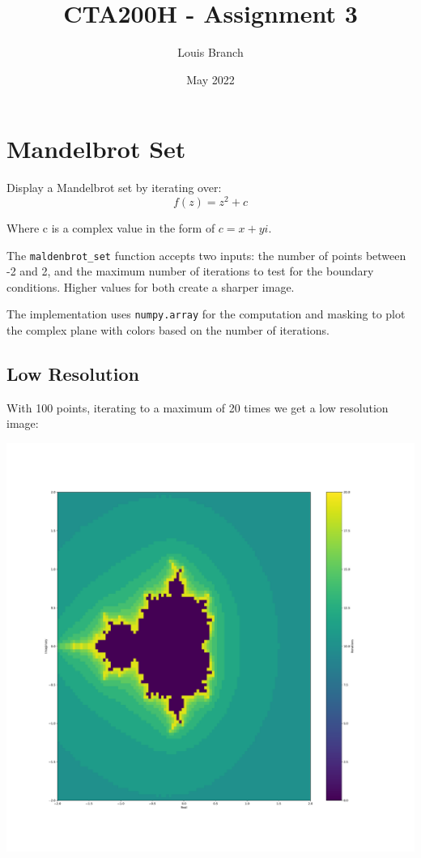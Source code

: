 \documentclass{article}
\title{CTA200H - Assignment 3}
\author{Louis Branch}
\date{May 2022}
\begin{document}
\maketitle

\section{Mandelbrot Set}

Display a Mandelbrot set by iterating over: \[f(z) = z^2 + c\]

Where c is a complex value in the form of $c = x + yi$.

The \verb|maldenbrot_set| function accepts two inputs: the number of points between -2 and 2, and the maximum number of iterations to test for the boundary conditions. Higher values for both create a sharper image.

The implementation uses  \verb|numpy.array| for the computation and masking to plot the complex plane with colors based on the number of iterations.

\subsection{Low Resolution}

With 100 points, iterating to a maximum of 20 times we get a low resolution image:

\includegraphics[scale=0.2]{mandelbrot_20.pdf}
\end{document}
